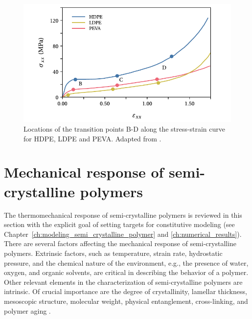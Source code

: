 \begin{figure}[htbp]
	\centering
	\includegraphics[width=\textwidth]{figures/stress_strain_curve_strobl}
	\caption{Locations of the transition points B-D along the stress-strain curve for HDPE, LDPE and PEVA. Adapted from \cite{hissNetworkStretchingSlip1999}.}
\label{fig:stress_strain_curve_strobl}
\end{figure}

\section{Mechanical response of semi-crystalline polymers}

The thermomechanical response of semi-crystalline polymers is reviewed in this section with the explicit goal of setting targets for constitutive modeling (see Chapter~\ref{ch:modeling_semi_crystalline_polymer} and \ref{ch:numerical_results}).
There are several factors affecting the mechanical response of semi-crystalline polymers.
Extrinsic factors, such as temperature, strain rate, hydrostatic pressure, and the chemical nature of the environment, e.g., the presence of water, oxygen, and organic solvents, are critical in describing the behavior of a polymer.
Other relevant elements in the characterization of semi-crystalline polymers are intrinsic.
Of crucial importance are the degree of crystallinity, lamellar thickness, mesoscopic structure, molecular weight, physical entanglement, cross-linking, and polymer aging \citep{ayoubEffectsCrystalContent2011, serbanTensilePropertiesSemicrystalline2013, callister2014materials, cundiffModelingViscoplasticBehavior2022}.

